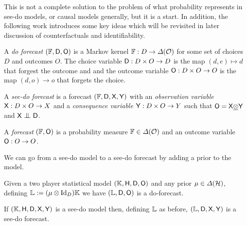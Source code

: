 This is not a complete solution to the problem of what probability represents in see-do models, or causal models generally, but it is a start. In addition, the following work introduces some key ideas which will be revisited in later discussion of counterfactuals and identifiability.

\begin{definition}
A \emph{do forecast} $(\mathbb{F},\mathsf{D},\mathsf{O})$ is a Markov kernel $\mathbb{F}:D\to \Delta(\mathcal{O})$ for some set of choices $D$ and outcomes $O$. The choice variable $\mathsf{D}:D\times O\to D$ is the map $(d,e)\mapsto d$ that forgest the outcome and and the outcome variable $\mathsf{O}:D\times O\to O$ is the map $(d,o)\to o$ that forgets the choice.

A \emph{see-do forecast} is a forecast $(\mathbb{F},\mathsf{D},\mathsf{X},\mathsf{Y})$ with an \emph{observation variable} $\mathsf{X}:D\times O\to X$ and a \emph{consequence variable} $\mathsf{Y}:D\times O\to Y$ such that $\mathsf{O}=\mathsf{X}\underline{\otimes}\mathsf{Y}$ and $\RV{X}\CI\RV{D}$.

A \emph{forecast} $(\mathbb{F},\mathsf{O})$ is a probability measure $\mathbb{F}\in\Delta(\mathcal{O})$ and an outcome variable $\mathsf{O}:O\to O$.
\end{definition}

We can go from a see-do model to a see-do forecast by adding a prior to the model.

\begin{theorem}
Given a two player statistical model $(\mathbb{K},\mathsf{H},\mathsf{D},\mathsf{O})$ and any prior $\mu\in \Delta(\mathcal{H})$, defining $\mathbb{L}:=(\mu\otimes \mathrm{Id}_D)\mathbb{K}$ we have $(\mathbb{L},\mathsf{D},\mathsf{O})$ is a do-forecast. 

If $(\mathbb{K},\mathsf{H},\mathsf{D},\mathsf{X},\mathsf{Y})$ is a see-do model then, defining $\mathbb{L}$ as before, $(\mathbb{L},\mathsf{D},\mathsf{X},\mathsf{Y})$ is a see-do forecast.
\end{theorem}


